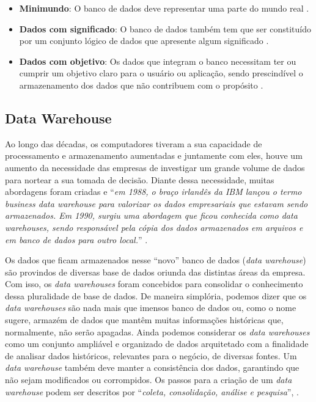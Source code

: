 \begin{itemize}
  \item \textbf{Minimundo}: O banco de dados deve representar uma parte do mundo real \cite{vida2021datawarehouse}.
  \item \textbf{Dados com significado}: O banco de dados também tem que ser constituído por um conjunto lógico de dados que apresente algum significado \cite{vida2021datawarehouse}.
  \item \textbf{Dados com objetivo}: Os dados que integram o banco necessitam ter ou cumprir um objetivo claro para o usuário ou aplicação, sendo prescindível o armazenamento dos dados que não contribuem com o propósito \cite{vida2021datawarehouse}.
\end{itemize} 


\subsection{Data Warehouse}
\label{subsec:datawarehouse}

Ao longo das décadas, os computadores tiveram a sua capacidade de processamento e armazenamento aumentadas e juntamente com eles, houve um aumento da necessidade das empresas de investigar um grande volume de dados para nortear a sua tomada de decisão. Diante dessa necessidade, muitas abordagens foram criadas e \enquote{\textit{em 1988, o braço irlandês da IBM lançou o termo business data warehouse para valorizar os dados empresariais que estavam sendo armazenados. Em 1990, surgiu uma abordagem que ficou conhecida como data warehouses, sendo responsável pela cópia dos dados armazenados em arquivos e em banco de dados para outro local.}} \cite{vida2021datawarehouse}.

Os dados que ficam armazenados nesse \enquote{novo} banco de dados (\textit{data warehouse}) são provindos de diversas base de dados oriunda das distintas áreas da empresa. Com isso, os \textit{data warehouses} foram concebidos para consolidar o conhecimento dessa pluralidade de base de dados. De maneira simplória, podemos dizer que os \textit{data warehouses} são nada mais que imensos banco de dados ou, como o nome sugere, armazém de dados que mantêm muitas informações históricas que, normalmente, não serão apagadas. Ainda podemos considerar os \textit{data warehouses} como um conjunto ampliável e organizado de dados arquitetado com a finalidade de analisar dados históricos, relevantes para o negócio, de diversas fontes. Um \textit{data warehouse} também deve manter a consistência dos dados, garantindo que não sejam modificados ou corrompidos. Os passos para a criação de um \textit{data warehouse} podem ser descritos por \enquote{\textit{coleta, consolidação, análise e pesquisa}}, \cite{vida2021datawarehouse}.

